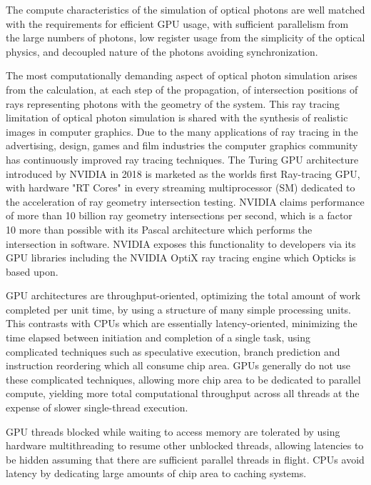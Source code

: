 \documentclass{webofc}
\begin{document}
The compute characteristics of the simulation of optical photons
are well matched with the requirements for efficient GPU usage, 
with sufficient parallelism from the large numbers of photons, 
low register usage from the simplicity of the optical physics, 
and decoupled nature of the photons avoiding synchronization.

The most computationally demanding aspect of optical photon simulation 
arises from the calculation, at each step of the propagation, 
of intersection positions of rays representing photons with the geometry of the system.
This ray tracing limitation of optical photon simulation is shared 
with the synthesis of realistic images in computer graphics. Due to the many applications
of ray tracing in the advertising, design, games and film industries the computer graphics
community has continuously improved ray tracing techniques. The Turing GPU architecture 
introduced by NVIDIA in 2018 is marketed as the worlds first Ray-tracing GPU, with   
hardware "RT Cores" in every streaming multiprocessor (SM) dedicated to the 
acceleration of ray geometry intersection testing.
NVIDIA claims performance of more than 10 billion ray geometry intersections 
per second, which is a factor 10 more than possible with its Pascal architecture 
which performs the intersection in software. NVIDIA exposes this functionality 
to developers via its GPU libraries including the NVIDIA OptiX ray tracing engine
which Opticks is based upon.

GPU architectures are throughput-oriented\cite{throughput}, optimizing the total amount of work completed per unit time,
by using a structure of many simple processing units. This contrasts with CPUs which are essentially latency-oriented, 
minimizing the time elapsed between initiation and completion of a single task, using complicated techniques 
such as speculative execution, branch prediction and instruction reordering which all consume chip area.
GPUs generally do not use these complicated techniques, allowing more chip area to be dedicated to parallel compute, 
yielding more total computational throughput across all threads at the expense of slower single-thread execution.

GPU threads blocked while waiting to access memory are tolerated by using 
hardware multithreading to resume other unblocked threads, allowing latencies to be hidden assuming 
that there are sufficient parallel threads in flight. CPUs avoid latency by dedicating large amounts 
of chip area to caching systems. 
\end{document}
